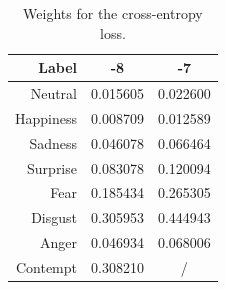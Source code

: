 \begin{table}[h]
\centering
\begin{tabular}{r | c | c}
\hline
 \textbf{Label} & \textbf{\affectnet{}-8} & \textbf{\affectnet{}-7} \\ 
  \hline
 Neutral & 0.015605 & 0.022600\\
 Happiness & 0.008709 & 0.012589\\
  Sadness & 0.046078 & 0.066464\\
 Surprise & 0.083078 & 0.120094\\
 Fear & 0.185434 & 0.265305\\
 Disgust & 0.305953 & 0.444943\\
 Anger & 0.046934 & 0.068006\\
 Contempt & 0.308210 & / \\ \hline
\end{tabular}
\caption{Weights for the cross-entropy loss.}
\label{tab:weights}
\end{table}









